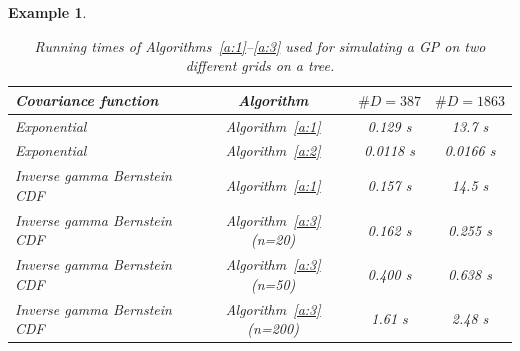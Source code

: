 \documentclass[alpha-refs]{wiley-article}
\newtheorem{ex}{Example}
\begin{document}
\begin{ex}
\begin{table}
	\centering
	\begin{tabular}{l|c||c|c}
		Covariance function & Algorithm & $\#D = 387$ & $\#D = 1863$ \\
		\hline\hline
 		Exponential & Algorithm~\ref{a:1} & 0.129 s & 13.7 s \\
 		Exponential & Algorithm~\ref{a:2} & 0.0118 s &   0.0166 s \\
 		Inverse gamma Bernstein CDF & Algorithm~\ref{a:1} & 0.157 s & 14.5 s\\
 		Inverse gamma Bernstein CDF & Algorithm~\ref{a:3} (n=20) & 0.162 s & 0.255 s\\
 		Inverse gamma Bernstein CDF & Algorithm~\ref{a:3} (n=50) & 0.400 s & 0.638 s\\
 		Inverse gamma Bernstein CDF & Algorithm~\ref{a:3} (n=200) &  1.61 s & 2.48 s\\
	\end{tabular}
	\caption{Running times of Algorithms~\ref{a:1}--\ref{a:3} used for simulating a GP on two different grids on a tree.} 
	\label{tab:algotimes}
\end{table}
\end{ex}
\end{document}
